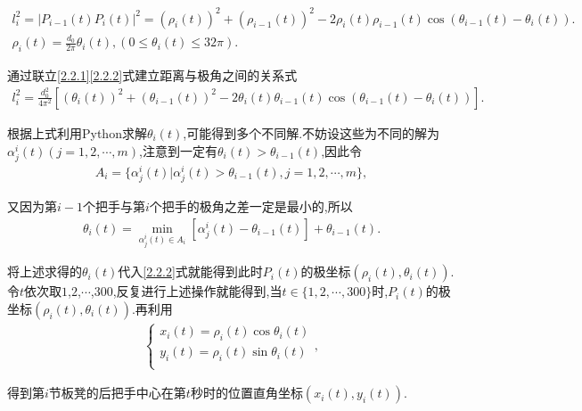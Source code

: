 \documentclass[../main.tex]{subfiles}
\begin{document}
  \begin{gather}
      l_{i}^{2}=| P_{i-1}(t)P_{i}(t)|^2=(\rho _{i}(t))^2+(\rho _{i-1}(t))^2 - 2\rho _{i}(t)\rho _{i-1}(t)\cos (\theta _{i-1}(t)-\theta _{i}(t)) .\label{2.2.1}
      \\
      \rho _{i}(t)=\frac{d_0}{2\pi}\theta _{i}(t),(0\leqslant \theta _{i}(t)\leqslant 32\pi) .\label{2.2.2}
      \end{gather}
      \par 通过联立\eqref{2.2.1}\eqref{2.2.2}式建立距离与极角之间的关系式
      \begin{align}
          l_{i}^{2}=\frac{d_{0}^{2}}{4\pi ^2}[(\theta _{i}(t))^2+(\theta _{i-1}(t))^2 - 2\theta _{i}(t)\theta _{i-1}(t)\cos (\theta _{i-1}(t)-\theta _{i}(t))] .\label{2.0.0}
          \end{align}
      \par 根据上式利用Python求解\(\theta _{i}(t)\),可能得到多个不同解.不妨设这些为不同的解为\(\alpha _{j}^{i}(t) (j = 1,2,\cdots ,m)\),注意到一定有\(\theta _{i}(t)>\theta _{i-1}(t)\),因此令
      \begin{align}\label{1.........9}
      A_i = \{ \alpha _{j}^{i}(t) |\alpha _{j}^{i}(t) >\theta _{i-1}(t),j = 1,2,\cdots ,m \},
      \end{align}
      \par 又因为第\(i - 1\)个把手与第$i$个把手的极角之差一定是最小的,所以
      \begin{align}\label{1.........10}
          \theta _i(t)=\underset{\alpha _{j}^{i}(t)\in A_i}{\min}\left[ \alpha _{j}^{i}\left( t \right) -\theta _{i-1}\left( t \right) \right] +\theta _{i-1}\left( t \right) .  
          \end{align}
          \par 将上述求得的\(\theta _i(t)\)代入\eqref{2.2.2}式就能得到此时\(P_{i}(t)\)的极坐标\((\rho _{i}(t),\theta _{i}(t))\).令\(t\)依次取\(1\),\(2\),\(\cdots\),\(300\),反复进行上述操作就能得到,当\(t\in \{ 1,2,\cdots ,300 \}\)时,\(P_{i}(t)\)的极坐标\((\rho _{i}(t),\theta _{i}(t))\).再利用
          \begin{align}
          \begin{cases}
          x_{i}(t)=\rho _{i}(t)\cos \theta _{i}(t)\\
          y_{i}(t)=\rho _{i}(t)\sin \theta _{i}(t)\\
          \end{cases},\label{1.........11} 
          \end{align}
          \par 得到第$i$节板凳的后把手中心在第\(t\)秒时的位置直角坐标\((x_i(t),y_i(t))\).
\end{document}
